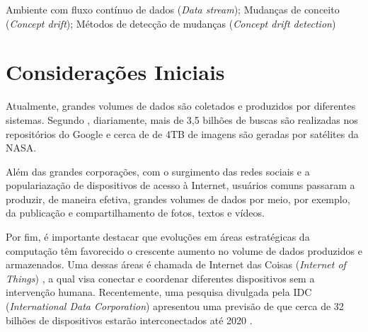 \documentclass[qual, classic, a4paper]{ufbathesis}
\begin{document}

\begin{keywords}
    Ambiente com fluxo contínuo de dados (\textit{Data stream}); Mudanças de conceito (\textit{Concept drift}); Métodos de detecção de mudanças (\textit{Concept drift detection})
\end{keywords}

%


\tableofcontents

\listoffigures

\listoftables

\mainmatter

% 
% 
% 
%

\label{introducao}

\section{Considerações Iniciais}

Atualmente, grandes volumes de dados são coletados e produzidos por diferentes sistemas. Segundo , diariamente, mais de 3,5 bilhões de buscas são realizadas nos repositórios do Google e cerca de de 4TB de imagens são geradas por satélites da NASA. 

Além das grandes corporações, com o surgimento das redes sociais e a populariazação de dispositivos de acesso à Internet, usuários comuns passaram a produzir, de maneira efetiva, grandes volumes de dados por meio, por exemplo, da publicação e compartilhamento de fotos, textos e vídeos.

Por fim, é importante destacar que evoluções em áreas estratégicas da computação têm favorecido o crescente aumento no volume de dados produzidos e armazenados. Uma dessas áreas é chamada de Internet das Coisas  (\textit{Internet of Things}) \cite{iot}, a qual visa conectar e coordenar diferentes dispositivos sem a intervenção humana. Recentemente, uma pesquisa divulgada pela IDC (\textit{International Data Corporation})  apresentou uma previsão de que cerca de 32 bilhões de dispositivos estarão interconectados até 2020 \cite{iot}. 
\end{document}
